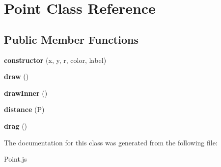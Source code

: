 \hypertarget{class_point}{}\section{Point Class Reference}
\label{class_point}
\subsection*{Public Member Functions}
\begin{DoxyCompactItemize}
\item 
\mbox{\label{class_point_ab0a99bcab3d76bb222d3184dcd9d8437}} 
{\bfseries constructor} (x, y, r, color, label)
\item 
\mbox{\label{class_point_a930a8741ad3edf5991e53f0a4727d0d6}} 
{\bfseries draw} ()
\item 
\mbox{\label{class_point_a1df67ea45f7dca0c9e03ebefda4b77a9}} 
{\bfseries draw\+Inner} ()
\item 
\mbox{\label{class_point_a763cb2efc606789eeea026d4227145a7}} 
{\bfseries distance} (P)
\item 
\mbox{\label{class_point_a0f835b7b71435459689faf580e7e0e4f}} 
{\bfseries drag} ()
\end{DoxyCompactItemize}


The documentation for this class was generated from the following file\+:\begin{DoxyCompactItemize}
\item 
Point.\+js\end{DoxyCompactItemize}
